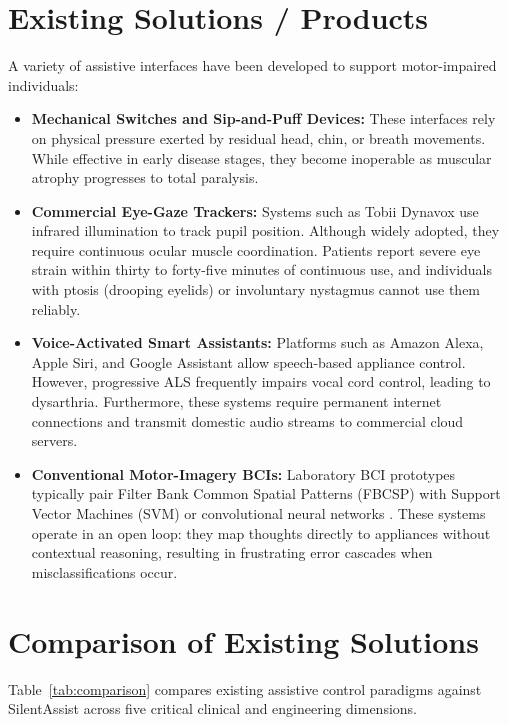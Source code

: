 \documentclass[12pt,a4paper]{report}
\begin{document}
\section{Existing Solutions / Products}
A variety of assistive interfaces have been developed to support motor-impaired individuals:
\begin{itemize}[leftmargin=1.5em]
    \item \textbf{Mechanical Switches and Sip-and-Puff Devices:} These interfaces rely on physical pressure exerted by residual head, chin, or breath movements. While effective in early disease stages, they become inoperable as muscular atrophy progresses to total paralysis.
    \item \textbf{Commercial Eye-Gaze Trackers:} Systems such as Tobii Dynavox use infrared illumination to track pupil position. Although widely adopted, they require continuous ocular muscle coordination. Patients report severe eye strain within thirty to forty-five minutes of continuous use, and individuals with ptosis (drooping eyelids) or involuntary nystagmus cannot use them reliably.
    \item \textbf{Voice-Activated Smart Assistants:} Platforms such as Amazon Alexa, Apple Siri, and Google Assistant allow speech-based appliance control. However, progressive ALS frequently impairs vocal cord control, leading to dysarthria. Furthermore, these systems require permanent internet connections and transmit domestic audio streams to commercial cloud servers.
    \item \textbf{Conventional Motor-Imagery BCIs:} Laboratory BCI prototypes typically pair Filter Bank Common Spatial Patterns (FBCSP) with Support Vector Machines (SVM) or convolutional neural networks \cite{schirrmeister2017deep}. These systems operate in an open loop: they map thoughts directly to appliances without contextual reasoning, resulting in frustrating error cascades when misclassifications occur.
\end{itemize}

\section{Comparison of Existing Solutions}
Table~\ref{tab:comparison} compares existing assistive control paradigms against SilentAssist across five critical clinical and engineering dimensions.
\end{document}
